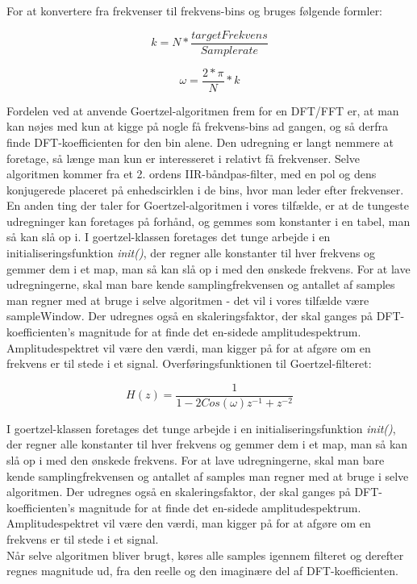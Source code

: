 For at konvertere fra frekvenser til frekvens-bins og  bruges følgende formler:

\noindent\begin{minipage}{.5\linewidth}
\begin{equation}
  k=N*\dfrac{targetFrekvens}{Samplerate}
\end{equation}
\end{minipage}%
\begin{minipage}{.5\linewidth}
\begin{equation}
  \omega = \dfrac{2*\pi}{N}*k
\end{equation}
\end{minipage}


Fordelen ved at anvende Goertzel-algoritmen frem for en DFT/FFT er, at man kan nøjes med kun at kigge på nogle få frekvens-bins ad gangen, og så derfra finde DFT-koefficienten for den bin alene. Den udregning er langt nemmere at foretage, så længe man kun er interesseret i relativt få frekvenser. Selve algoritmen kommer fra et 2. ordens IIR-båndpas-filter, med en pol og dens konjugerede placeret på enhedscirklen i de bins, hvor man leder efter frekvenser. En anden ting der taler for Goertzel-algoritmen i vores tilfælde, er at de tungeste udregninger kan foretages på forhånd, og gemmes som konstanter i en tabel, man så kan slå op i. I goertzel-klassen foretages det tunge arbejde i en initialiseringsfunktion \textit{init()}, der regner alle konstanter til hver frekvens og gemmer dem i et map, man så kan slå op i med den ønskede frekvens. For at lave udregningerne, skal man bare kende samplingfrekvensen og antallet af samples man regner med at bruge i selve algoritmen - det vil i vores tilfælde være sampleWindow. Der udregnes også en skaleringsfaktor, der skal ganges på DFT-koefficienten's magnitude for at finde det en-sidede amplitudespektrum. Amplitudespektret vil være den værdi, man kigger på for at afgøre om en frekvens er til stede i et signal. 
Overføringsfunktionen til Goertzel-filteret:



\begin{equation}\label{eq:transferfunction}
H(z) = \frac{1}{1-2Cos(\omega)z^{-1}+z^{-2}}
\end{equation}


I goertzel-klassen foretages det tunge arbejde i en initialiseringsfunktion \textit{init()}, der regner alle konstanter til hver frekvens og gemmer dem i et map, man så kan slå op i med den ønskede frekvens. For at lave udregningerne, skal man bare kende samplingfrekvensen og antallet af samples man regner med at bruge i selve algoritmen. Der udregnes også en skaleringsfaktor, der skal ganges på DFT-koefficienten's magnitude for at finde det en-sidede amplitudespektrum. Amplitudespektret vil være den værdi, man kigger på for at afgøre om en frekvens er til stede i et signal. \\
Når selve algoritmen bliver brugt, køres alle samples igennem filteret og derefter regnes magnitude ud, fra den reelle og den imaginære del af DFT-koefficienten.






